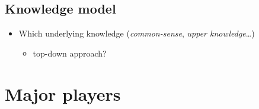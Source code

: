\documentclass[twocolumn,a4paper]{article}
\begin{document}
\subsection{Knowledge model}

\begin{itemize}
	\item  Which underlying knowledge (\emph{common-sense}, \emph{upper knowledge}\ldots{})
	\begin{itemize}
		\item  top-down approach?
	\end{itemize}

\end{itemize}

\section{Major players}
\end{document}
